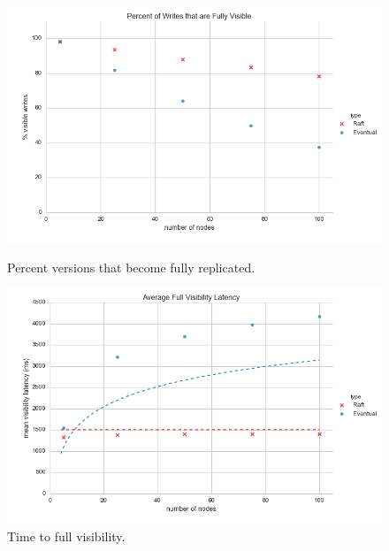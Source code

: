 \documentclass{article}
\begin{document}
\begin{figure}[!h]
    \centering
      \includegraphics[width=\linewidth]{figures/scaling/visible_writes}
      \caption{Percent versions that become fully replicated.}\label{fig:scaling_visible_writes}
    \endminipage\hfill
      \includegraphics[width=\linewidth]{figures/scaling/visibility_latency}
      \caption{Time to full visibility.}\label{fig:scaling_visibility_latency}
    \endminipage
\end{figure}
\end{document}
